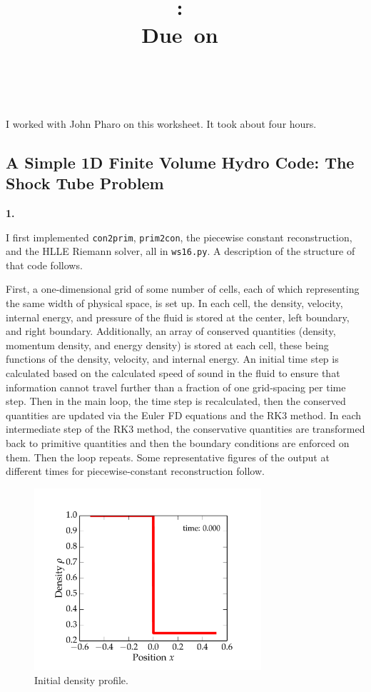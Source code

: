 \documentclass{article}
\title{\vspace{2in}\textmd{\textbf{\hmwkClass:\ \hmwkTitle}}\\\normalsize\vspace{0.1in}\small{Due\ on\ \hmwkDueDate}\\\vspace{0.1in}\large{\textit{\hmwkClassInstructor\ \hmwkClassTime}}\vspace{3in}}
\date{}
\author{\textbf{\hmwkAuthorName}}
\begin{document}
\begin{spacing}{1.1}

\newpage


I worked with John Pharo on this worksheet. It took about four hours.

\subsection{A Simple 1D Finite Volume Hydro Code: The Shock Tube Problem}

\noindent \textbf{1.}

I first implemented \texttt{con2prim}, \texttt{prim2con}, the piecewise constant reconstruction, and the HLLE Riemann solver, all in \texttt{ws16.py}. A description of the structure of that code follows. 

First, a one-dimensional grid of some number of cells, each of which representing the same width of physical space, is set up. In each cell, the density, velocity, internal energy, and pressure of the fluid is stored at the center, left boundary, and right boundary. Additionally, an array of conserved quantities (density, momentum density, and energy density) is stored at each cell, these being functions of the density, velocity, and internal energy. An initial time step is calculated based on the calculated speed of sound in the fluid to ensure that information cannot travel further than a fraction of one grid-spacing per time step.
	Then in the main loop, the time step is recalculated, then the conserved quantities are updated via the Euler FD equations and the RK3 method. In each intermediate step of the RK3 method, the conservative quantities are transformed back to primitive quantities and then the boundary conditions are enforced on them. Then the loop repeats.
	Some representative figures of the output at different times for piecewise-constant reconstruction follow.

\begin{figure}[H]
 \centering
 \hspace{0cm} \includegraphics[width=0.75\textwidth]{figs-pc/0.pdf}
 \caption{Initial density profile.}
\end{figure} 


\end{spacing}
\end{document}
